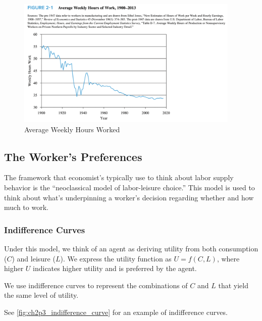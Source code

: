 \begin{figure}[!htb]
    \centering
        \includegraphics[width=0.95\textwidth]{../input/ch_2p2_weekly_hours.png}
    \caption{Average Weekly Hours Worked}
    \label{fig:ch2p2_weekly_hours}
\end{figure}

\FloatBarrier

\subsection{The Worker's Preferences}

The framework that economist's typically use
to think about labor supply behavior is the 
``neoclassical model of labor-leisure choice.''
This model is used to think about what's underpinning 
a worker's decision regarding whether and how much 
to work.


\subsubsection{Indifference Curves}

Under this model, we think of an agent as 
deriving utility from both
consumption ($C$) and leisure ($L$).
We express the utility function as
$U = f(C, L)$, where higher $U$ 
indicates higher utility and is 
preferred by the agent.

We use indifference curves to 
represent the combinations of $C$ and $L$
that yield the same level of utility.

See \autoref{fig:ch2p3_indifference_curve} 
for an example of indifference curves.

